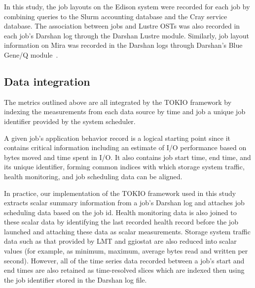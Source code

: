 In this study, the job layouts on the Edison system were recorded for each job by combining queries to the Slurm accounting database and the Cray service database.
The association between jobs and Lustre OSTs was also recorded in each job's Darshan log through the Darshan Lustre module.
Similarly, job layout information on Mira was recorded in the Darshan logs through Darshan's Blue Gene/Q module~\cite{snyder2016modular}.

\subsection{Data integration} \label{sec:data-integration}

The metrics outlined above are all integrated by the TOKIO framework by indexing the measurements from each data source by time and job a unique job identifier provided by the system scheduler.

A given job's application behavior record is a logical starting point since it contains critical information including an estimate of I/O performance based on bytes moved and time spent in I/O.  It also contains job start time, end time, and its unique identifier, forming common indices with which storage system traffic, health monitoring, and job scheduling data can be aligned.

In practice, our implementation of the TOKIO framework used in this study  extracts scalar summary information from a job's Darshan log and attaches job scheduling data based on the job id.
Health monitoring data is also joined to these scalar data by identifying the last recorded health record before the job launched and attaching these data as scalar measurements.
Storage system traffic data such as that provided by LMT and ggiostat are also reduced into scalar values (for example, as minimum, maximum, average bytes read and written per second).
However, all of the time series data recorded between a job's start and end times are also retained as time-resolved slices which are indexed then using the job identifier stored in the Darshan log file.

